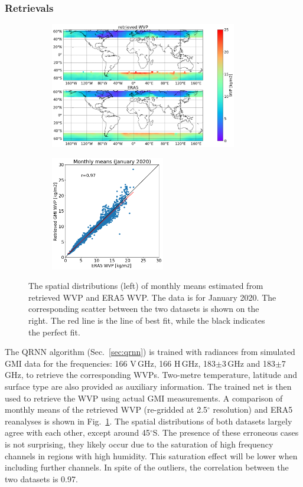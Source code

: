 \documentclass[12pt,oneside,a4paper]{article}
\begin{document}
\subsubsection{Retrievals}
\label{sec:preliminary_results}
\begin{figure}[t]
	\centering
	\begin{subfigure}{.54\textwidth}
		\includegraphics[height = 55mm]{Figures/WVP_spatial_jan2020.png}
	\end{subfigure}
	\begin{subfigure}{.34\textwidth}
	\includegraphics[height = 50mm]{Figures/WVP_scatter_monthlymean.png} 
	\end{subfigure}
	\caption{The spatial distributions (left) of monthly means estimated from retrieved WVP and ERA5 WVP. The data is for January 2020. The corresponding scatter between the two datasets is shown on the right. The red line is the line of best fit, while the black indicates the perfect fit.}
	\label{fig:WVP_retrievals}
\end{figure}

The QRNN algorithm (Sec.~\ref{sec:qrnn}) is trained with radiances from
simulated GMI data for the frequencies: 166 V\,GHz, 166 H\,GHz, 183$\pm$3\,GHz
and 183$\pm$7\,GHz, to retrieve the corresponding WVPs. Two-metre temperature,
latitude and surface type are also provided as auxiliary information. The
trained net is then used to retrieve the WVP using actual GMI measurements. A
comparison of monthly means of the retrieved WVP (re-gridded at 2.5$^{\circ}$
resolution) and ERA5 reanalyses is shown in Fig.~\ref{fig:WVP_retrievals}. The
spatial distributions of both datasets largely agree with each other, except
around 45$^{\circ}$S. The presence of these erroneous cases is not surprising,
they likely occur due to the saturation of high frequency channels in regions
with high humidity. This saturation effect will be lower when including further
channels. In spite of the outliers, the correlation between the two datasets is
0.97.
\end{document}
